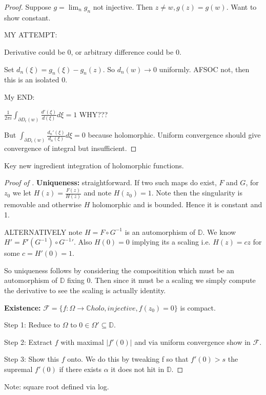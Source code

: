 \documentclass[11pt]{article}
\newcommand{\normOne}[1]{\left\lvert#1\right\rvert}
\theoremstyle{remark}
\begin{document}
\begin{proof}
	Suppose $g = \lim_n g_n$ not injective. Then $z\neq w, g(z) = g(w)$. Want to show constant.

	MY ATTEMPT: 

	Derivative could be 0, or arbitrary difference could be 0. 

	Set $d_n(\xi) = g_n(\xi) - g_n(z)$. So $d_n(w) \to 0$ uniformly. AFSOC not, then this is an isolated 0. 

	My END:

	$\frac{1}{2\pi i}\int_{\partial D_{\epsilon}(w)} \frac{d'(\xi)}{d(\xi)}d\xi = 1$ WHY???

	But $\int_{\partial D_{\epsilon}(w)} \frac{d_n'(\xi)}{d_n(\xi)}d\xi = 0$ because holomorphic. Uniform convergence should give convergence of integral but insufficient.
\end{proof}

Key new ingredient integration of holomorphic functions. 

\begin{proof}[Proof of \label{thm:RM}]
	\textbf{Uniqueness:} straightforward. If two such maps do exist, $F$ and $G$, for $z_0$ we let $H(z) = \frac{F(z)}{H(z)}$ and note $H(z_0) = 1$. Note then the singularity is removable and otherwise $H$ holomorphic and is bounded. Hence it is constant and 1. 

	ALTERNATIVELY note $H = F \circ G^{-1}$ is an automorphism of $\mathbb{D}$. We know $H' = F'(G^{-1})\circ G^{-1}'$. Also $H(0) = 0$ implying its a scaling i.e. $H(z) = cz$ for some $c=H'(0)=1$. 

	So uniqueness follows by considering the compositition which must be an automorphism of $\mathbb{D}$ fixing $0$. Then since it must be a scaling we simply compute the derivative to see the scaling is actually identity. 

	\textbf{Existence:} $\mathcal{F} = \{f : \Omega \to \mathbb{C} holo, injective,f(z_0) = 0\}$ is compact. 

	Step 1: Reduce to $\Omega$ to $0 \in \Omega'\subseteq \mathbb{D}$. 

	Step 2: Extract $f$ with maximal $\normOne{f'(0)}$ and via uniform convergence show in $\mathcal{F}$. 

	Step 3: Show this $f$ onto. We do this by tweaking f so that $f'(0) > s$ the supremal $f'(0)$ if there exists $\alpha$ it does not hit in $\mathbb{D}$. 
\end{proof}

Note: square root defined via log.
\end{document}

